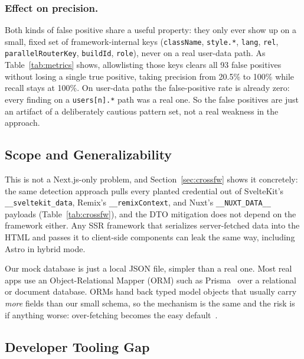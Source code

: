\documentclass[runningheads]{llncs}
\begin{document}
\subsubsection{Effect on precision.}
Both kinds of false positive share a useful property: they only ever show
up on a small, fixed set of framework-internal keys (\texttt{className},
\texttt{style.*}, \texttt{lang}, \texttt{rel},
\texttt{parallelRouterKey}, \texttt{buildId}, \texttt{role}), never on a
real user-data path.  As Table~\ref{tab:metrics} shows, allowlisting those
keys clears all 93 false positives without losing a single true positive,
taking precision from 20.5\% to 100\% while recall stays at 100\%.  On
user-data paths the false-positive rate is already zero: every finding on
a \texttt{users[n].*} path was a real one.  So the false positives are
just an artifact of a deliberately cautious pattern set, not a real
weakness in the approach.

\subsection{Scope and Generalizability}

This is not a Next.js-only problem, and Section~\ref{sec:crossfw} shows it
concretely: the same detection approach pulls every planted credential out
of SvelteKit's \texttt{\_\_sveltekit\_data}, Remix's
\texttt{\_\_remixContext}, and Nuxt's \texttt{\_\_NUXT\_DATA\_\_} payloads
(Table~\ref{tab:crossfw}), and the DTO mitigation does not depend on the
framework either.  Any SSR framework that serializes server-fetched data
into the HTML and passes it to client-side components can leak the same
way, including Astro in hybrid mode.

Our mock database is just a local JSON file, simpler than a real one.
Most real apps use an Object-Relational Mapper (ORM) such as
Prisma~\cite{prisma} over a relational or document database.  ORMs hand
back typed model objects that usually carry \emph{more} fields than our
small schema, so the mechanism is the same and the risk is if anything
worse: over-fetching becomes the easy default~\cite{genfer2022}.

\subsection{Developer Tooling Gap}
\end{document}
